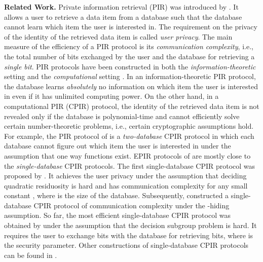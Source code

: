 \documentclass[JMC]{degruyter-journal}
\begin{document}
{\bf Related Work.} Private information retrieval (PIR) was
introduced by \cite{CGKS95}. It allows a user to retrieve a data
item from a  database  such that
 the database cannot learn which item the user is interested in.
The requirement on the privacy of the identity of the retrieved data
item is  called {\em user privacy}. The main measure of the
efficiency of a PIR protocol is its  {\em communication complexity},
i.e., the total number of bits exchanged by the user and the
database for retrieving a {\em single bit}.
 PIR protocols have been constructed in both the {\em information-theoretic} setting
  \cite{CGKS95,Amb97,BIKR02,BIK05,WY05,Yek07,Efr09,IS10,CFLWZ10} and the {\em computational}
  setting \cite{CG97,KO97,CMS99,KO00,YS01,Chang04,GR05,Lip05,GKL10}.
In an information-theoretic PIR protocol, the database learns {\em
absolutely}  no information on which item the user is interested in
even if it has unlimited computing power. On the other hand, in a
computational PIR (CPIR) protocol, the identity of the retrieved
data item is not revealed only if the database is polynomial-time
and cannot efficiently solve certain number-theoretic problems,
i.e., certain cryptographic assumptions hold. For example, the PIR
protocol of \cite{CG97} is a {\em two-database} CPIR protocol in
which each database cannot figure out which item the user is
interested in under the assumption that one way functions exist.
EPIR protocols of \cite{BCPT07,BC09} are mostly close to the {\em
single-database} CPIR protocols. The first single-database CPIR
protocol was proposed by \cite{KO97}. It achieves the user privacy
under the assumption that deciding quadratic residuosity is hard and
has communication complexity  for any small constant ,
where  is the size of the database. Subsequently,  \cite{CMS99}
constructed  a single-database CPIR protocol of communication
complexity   under the  -hiding assumption.  So
far, the most efficient single-database CPIR protocol was obtained
by \cite{GR05} under the assumption that the decision subgroup problem
is hard.  It requires the user to exchange  bits with the
database for retrieving  bits, where  is the
security parameter.
Other constructions of single-database CPIR  protocols can
be found in \cite{KO00,YS01,Chang04,GKL10}.
\end{document}

